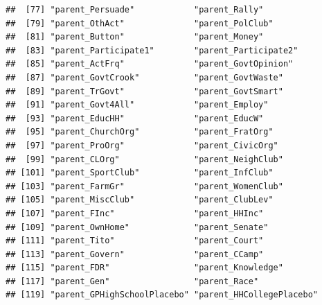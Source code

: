 \documentclass[
]{article}
\begin{document}
\begin{verbatim}
##  [77] "parent_Persuade"            "parent_Rally"              
##  [79] "parent_OthAct"              "parent_PolClub"            
##  [81] "parent_Button"              "parent_Money"              
##  [83] "parent_Participate1"        "parent_Participate2"       
##  [85] "parent_ActFrq"              "parent_GovtOpinion"        
##  [87] "parent_GovtCrook"           "parent_GovtWaste"          
##  [89] "parent_TrGovt"              "parent_GovtSmart"          
##  [91] "parent_Govt4All"            "parent_Employ"             
##  [93] "parent_EducHH"              "parent_EducW"              
##  [95] "parent_ChurchOrg"           "parent_FratOrg"            
##  [97] "parent_ProOrg"              "parent_CivicOrg"           
##  [99] "parent_CLOrg"               "parent_NeighClub"          
## [101] "parent_SportClub"           "parent_InfClub"            
## [103] "parent_FarmGr"              "parent_WomenClub"          
## [105] "parent_MiscClub"            "parent_ClubLev"            
## [107] "parent_FInc"                "parent_HHInc"              
## [109] "parent_OwnHome"             "parent_Senate"             
## [111] "parent_Tito"                "parent_Court"              
## [113] "parent_Govern"              "parent_CCamp"              
## [115] "parent_FDR"                 "parent_Knowledge"          
## [117] "parent_Gen"                 "parent_Race"               
## [119] "parent_GPHighSchoolPlacebo" "parent_HHCollegePlacebo"
\end{verbatim}
\end{document}
